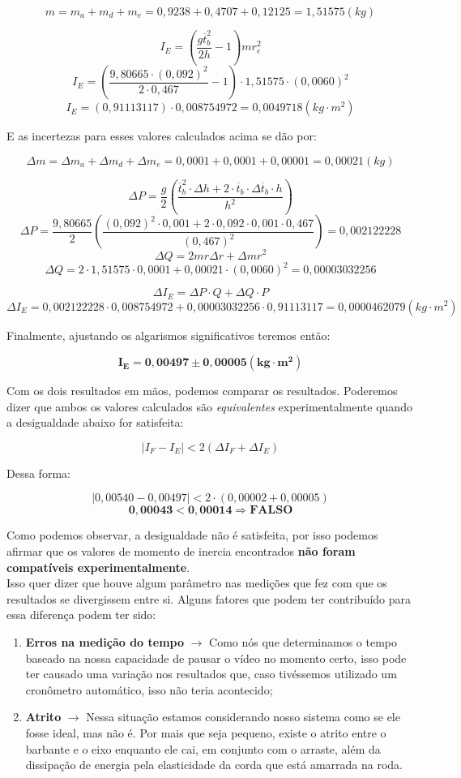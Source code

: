 \[m = m_a + m_d + m_e = 0,9238 + 0,4707 + 0,12125 = 1,51575 (kg)\]

\[I_E = \left( \frac{g \overline{t}_b^2}{2h} - 1 \right) m r_e^2\]
\[I_E = \left( \frac{9,80665 \cdot (0,092)^2}{2 \cdot 0,467} - 1 \right) \cdot 1,51575 \cdot (0,0060)^2\]
\[I_E = \left(0,91113117 \right) \cdot 0,008754972 = 0,0049718 (kg \cdot m^2)\]

E as incertezas para esses valores calculados acima se dão por:

\[\Delta m = \Delta m_a + \Delta m_d + \Delta m_e = 0,0001 + 0,0001 + 0,00001 = 0,00021 (kg)\]

\[
    \Delta P = \frac{g}{2} 
    \left( 
        \frac
        {\overline{t}_b^2 \cdot \Delta h + 2 \cdot \overline{t}_b \cdot \Delta \overline{t}_b \cdot h}
        {h^2} 
    \right)
\]
\[
    \Delta P = \frac{9,80665}{2} \left(\frac{(0,092)^2 \cdot 0,001 + 2 \cdot 0,092 \cdot 0,001 \cdot 0,467}{(0,467)^2} \right) = 0,002122228
\]
\[\Delta Q = 2mr \Delta r + \Delta m r^2\]
\[\Delta Q = 2 \cdot 1,51575 \cdot 0,0001 + 0,00021 \cdot (0,0060)^2 = 0,00003032256\]

\[\Delta I_E = \Delta P \cdot Q + \Delta Q \cdot P\]
\[\Delta I_E = 0,002122228 \cdot 0,008754972 + 0,00003032256 \cdot 0,91113117 = 0,0000462079 (kg \cdot m^2)\]

Finalmente, ajustando os algarismos significativos teremos então:

\[\mathbf{I_E = 0,00497 \pm 0,00005 (kg \cdot m^2)}\]

Com os dois resultados em mãos, podemos comparar os resultados. Poderemos dizer que ambos os valores calculados são \textit{equivalentes} experimentalmente quando a desigualdade abaixo for satisfeita:

\[| I_F - I_E | < 2 (\Delta I_F + \Delta I_E)\]

Dessa forma:

\[| 0,00540 - 0,00497 | < 2 \cdot (0,00002 + 0,00005)\]
\[\mathbf{0,00043 < 0,00014 \Rightarrow FALSO}\]

Como podemos observar, a desigualdade não é satisfeita, por isso podemos afirmar que os valores de momento de inercia encontrados \textbf{não foram compatíveis experimentalmente}. \\

Isso quer dizer que houve algum parâmetro nas medições que fez com que os resultados se divergissem entre si. Alguns fatores que podem ter contribuído para essa diferença podem ter sido:

\begin{enumerate}
    \item \textbf{Erros na medição do tempo} $\xrightarrow{}$ Como nós que determinamos o tempo baseado na nossa capacidade de pausar o vídeo no momento certo, isso pode ter causado uma variação nos resultados que, caso tivéssemos utilizado um cronômetro automático, isso não teria acontecido;
    \item \textbf{Atrito} $\xrightarrow{}$ Nessa situação estamos considerando nosso sistema como se ele fosse ideal, mas não é. Por mais que seja pequeno, existe o atrito entre o barbante e o eixo enquanto ele cai, em conjunto com o arraste, além da dissipação de energia pela elasticidade da corda que está amarrada na roda.
\end{enumerate}
